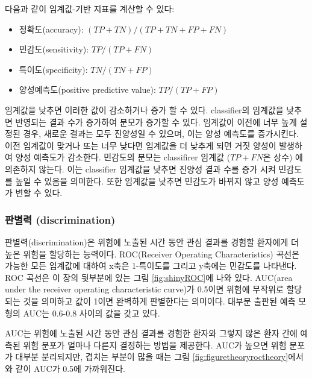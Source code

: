 \documentclass[11pt]{book}
\providecommand{\tightlist}{%
  \setlength{\itemsep}{0pt}\setlength{\parskip}{0pt}}
\theoremstyle{definition}
\theoremstyle{definition}
\theoremstyle{definition}
\theoremstyle{remark}
\begin{document}
다음과 같이 임계값-기반 지표를 계산할 수 있다:

\begin{itemize}
\tightlist
\item
  정확도(accuracy): \((TP+TN)/(TP+TN+FP+FN)\)
\item
  민감도(sensitivity): \(TP/(TP+FN)\)
\item
  특이도(specificity): \(TN/(TN+FP)\)
\item
  양성예측도(positive predictive value): \(TP/(TP+FP)\)
\end{itemize}

임계값을 낮추면 이러한 값이 감소하거나 증가 할 수 있다. classifier의
임계값을 낮추면 반영되는 결과 수가 증가하여 분모가 증가할 수 있다.
임계값이 이전에 너무 높게 설정된 경우, 새로운 결과는 모두 진양성일 수
있으며, 이는 양성 예측도를 증가시킨다. 이전 임계값이 맞거나 또는 너무
낮다면 임계값을 더 낮추게 되면 거짓 양성이 발생하여 양성 예측도가
감소한다. 민감도의 분모는 classifirer 임계값 (\(TP+FN\)은 상수) 에
의존하지 않는다. 이는 classifier 임계값을 낮추면 진양성 결과 수를 증가
시켜 민감도를 높일 수 있음을 의미한다. 또한 임계값을 낮추면 민감도가
바뀌지 않고 양성 예측도가 변할 수 있다.

\subsubsection*{판별력 (discrimination)}\label{-discrimination}

판별력(discrimination)은 위험에 노출된 시간 동안 관심 결과를 경험할
환자에게 더 높은 위험을 할당하는 능력이다. ROC(Receiver Operating
Characteristics) 곡선은 가능한 모든 임계값에 대하여 x축은 1-특이도를
그리고 y축에는 민감도를 나타낸다. ROC 곡선은 이 장의 뒷부분에 있는 그림
\ref{fig:shinyROC}에 나와 있다. AUC(area under the receiver operating
characteristic curve)가 0.5이면 위험에 무작위로 할당되는 것을 의미하고
값이 1이면 완벽하게 판별한다는 의미이다. 대부분 출판된 예측 모형의 AUC는
0.6-0.8 사이의 값을 갖고 있다.  

AUC는 위험에 노출된 시간 동안 관심 결과를 경험한 환자와 그렇지 않은 환자
간에 예측된 위험 분포가 얼마나 다른지 결정하는 방법을 제공한다. AUC가
높으면 위험 분포가 대부분 분리되지만, 겹치는 부분이 많을 때는 그림
\ref{fig:figuretheoryroctheory}에서와 같이 AUC가 0.5에 가까워진다.
\end{document}
